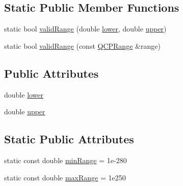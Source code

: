 \subsection*{Static Public Member Functions}
\begin{DoxyCompactItemize}
\item 
static bool \hyperlink{class_q_c_p_range_ab38bd4841c77c7bb86c9eea0f142dcc0}{valid\+Range} (double \hyperlink{class_q_c_p_range_aa3aca3edb14f7ca0c85d912647b91745}{lower}, double \hyperlink{class_q_c_p_range_ae44eb3aafe1d0e2ed34b499b6d2e074f}{upper})
\item 
static bool \hyperlink{class_q_c_p_range_a801b964752eaad6219be9d8a651ec2b3}{valid\+Range} (const \hyperlink{class_q_c_p_range}{Q\+C\+P\+Range} \&range)
\end{DoxyCompactItemize}
\subsection*{Public Attributes}
\begin{DoxyCompactItemize}
\item 
double \hyperlink{class_q_c_p_range_aa3aca3edb14f7ca0c85d912647b91745}{lower}
\item 
double \hyperlink{class_q_c_p_range_ae44eb3aafe1d0e2ed34b499b6d2e074f}{upper}
\end{DoxyCompactItemize}
\subsection*{Static Public Attributes}
\begin{DoxyCompactItemize}
\item 
static const double \hyperlink{class_q_c_p_range_ab46d3bc95030ee25efda41b89e2b616b}{min\+Range} = 1e-\/280
\item 
static const double \hyperlink{class_q_c_p_range_a5ca51e7a2dc5dc0d49527ab171fe1f4f}{max\+Range} = 1e250
\end{DoxyCompactItemize}
